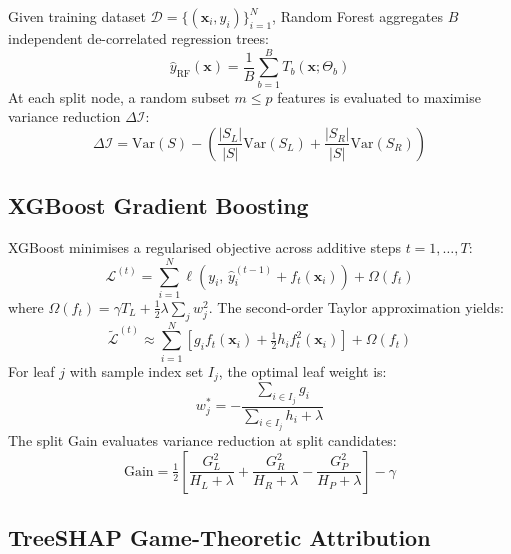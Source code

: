 \documentclass[conference]{IEEEtran}
\begin{document}
Given training dataset $\mathcal{D} = \{(\mathbf{x}_i, y_i)\}_{i=1}^N$,
Random Forest aggregates $B$ independent de-correlated regression trees:
\begin{equation}
  \hat{y}_{\text{RF}}(\mathbf{x}) =
    \frac{1}{B}\sum_{b=1}^B T_b\!\left(\mathbf{x};\Theta_b\right)
\end{equation}
At each split node, a random subset $m \le p$ features is evaluated to
maximise variance reduction $\Delta\mathcal{I}$:
\begin{equation}
  \Delta\mathcal{I} = \mathrm{Var}(S) -
    \left(\frac{|S_L|}{|S|}\mathrm{Var}(S_L) +
          \frac{|S_R|}{|S|}\mathrm{Var}(S_R)\right)
\end{equation}

\subsection{XGBoost Gradient Boosting}

XGBoost minimises a regularised objective across additive steps
$t = 1,\dots,T$:
\begin{equation}
  \mathcal{L}^{(t)} =
    \sum_{i=1}^N \ell\!\left(y_i,\,\hat{y}_i^{(t-1)} + f_t(\mathbf{x}_i)\right)
    + \Omega(f_t)
\end{equation}
where $\Omega(f_t) = \gamma T_L + \tfrac{1}{2}\lambda\sum_j w_j^2$.
The second-order Taylor approximation yields:
\begin{equation}
  \tilde{\mathcal{L}}^{(t)} \approx
    \sum_{i=1}^N \!\left[g_i f_t(\mathbf{x}_i)
                         + \tfrac{1}{2}h_i f_t^2(\mathbf{x}_i)\right]
    + \Omega(f_t)
\end{equation}
For leaf $j$ with sample index set $I_j$, the optimal leaf weight is:
\begin{equation}
  w_j^* = -\frac{\sum_{i\in I_j}g_i}{\sum_{i\in I_j}h_i + \lambda}
\end{equation}
The split Gain evaluates variance reduction at split candidates:
\begin{equation}
  \text{Gain} = \tfrac{1}{2}\!\left[\frac{G_L^2}{H_L{+}\lambda}
                                    +\frac{G_R^2}{H_R{+}\lambda}
                                    -\frac{G_P^2}{H_P{+}\lambda}\right]-\gamma
\end{equation}

\subsection{TreeSHAP Game-Theoretic Attribution}
\end{document}
